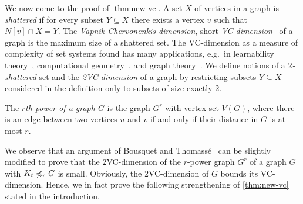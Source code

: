 We now come to the proof of \cref{thm:new-vc}. A set $X$ of vertices 
in a graph is \emph{shattered} if for every
subset $Y\subseteq X$ there exists 
a vertex $v$ such that $N[v]\cap X=Y$. The \emph{Vapnik-Chervonenkis dimension}, short \emph{VC-dimension}~\cite{chervonenkis1971theory} of a graph is the maximum size of a shattered set. 
The VC-dimension as a measure of complexity of set systems found has many applications, e.g.\ in learnability theory~\cite{haussler1987}, computational geometry~\cite{chazelle1989quasi},
and graph theory~\cite{alon2006dominating,BousquetT15,chepoi2007covering,eickmeyer2016neighborhood}.
We define notions of a {\em{$2$-shattered}} set and the {\em{2VC-dimension}} of a graph by restricting subsets $Y\subseteq X$ considered in the definition only to subsets of size exactly $2$.

The \emph{$r$th power of a graph $G$} is the graph $G^r$
with vertex set $V(G)$, where there is an edge between two 
vertices $u$ and $v$ if and only if their distance in $G$ is at most $r$. 

We observe that an argument of Bousquet and 
Thomass\'e~\cite{BousquetT15} can be slightly modified to prove that 
the $2$VC-dimension of the $r$-power graph $G^r$ of a graph $G$
with $K_t\not\preccurlyeq_r G$ is small. Obviously, the $2$VC-dimension of $G$
bounds its VC-dimension. Hence, we in fact prove the following strengthening of \cref{thm:new-vc} stated in the introduction. 

